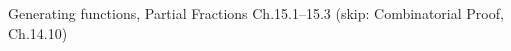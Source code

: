 \documentclass[handout]{mcs}
\begin{document}

\begin{staffnotes}
Generating functions, Partial Fractions Ch.15.1--15.3 (skip: Combinatorial Proof, Ch.14.10)
\end{staffnotes}






\end{document}
